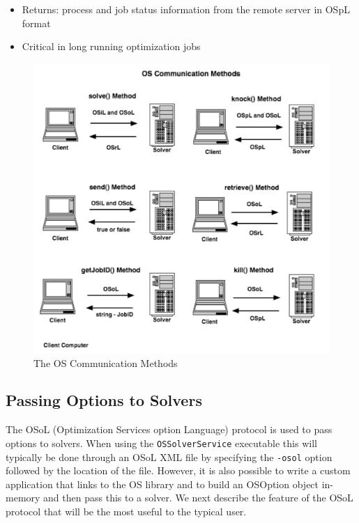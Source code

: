 \documentclass[11pt]{article}
\newcommand{\figurepath}{./figures}
\renewcommand{\_}{{\char"5F}}
\renewcommand{\{}{{\char"7B}}
\renewcommand{\}}{{\char"7D}}
\renewcommand{\^}{{\char"0D}}
\renewcommand{\'}{{\char"0D}}
\begin{document}
\begin{enumerate}[Step 1:]
\begin{itemize}
\begin{itemize}
\item Returns: process and job status information from the remote server in OSpL format

\item Critical in long running optimization jobs

\end{itemize}

\end{itemize}


\begin{figure}[ht]
\centering
\includegraphics[scale=0.5]{./figures/osCommunicationMethods.pdf}
\caption{The OS Communication Methods}
\label{figure:osCommunicationMethods}
\end{figure}


\subsection{Passing Options to Solvers}

The OSoL (Optimization Services option Language) protocol is used to pass options to solvers.   
When using the {\tt OSSolverService} executable this will typically be done through an OSoL XML file 
by specifying the {\tt -osol} option followed by the location of the file.  However, it is also possible 
to write a custom application that links to the OS library and to build an OSOption object in-memory 
and then pass this to a solver. We next describe the  feature of the OSoL protocol that will be the most 
useful to the typical user.


\end{enumerate}
\end{document}
